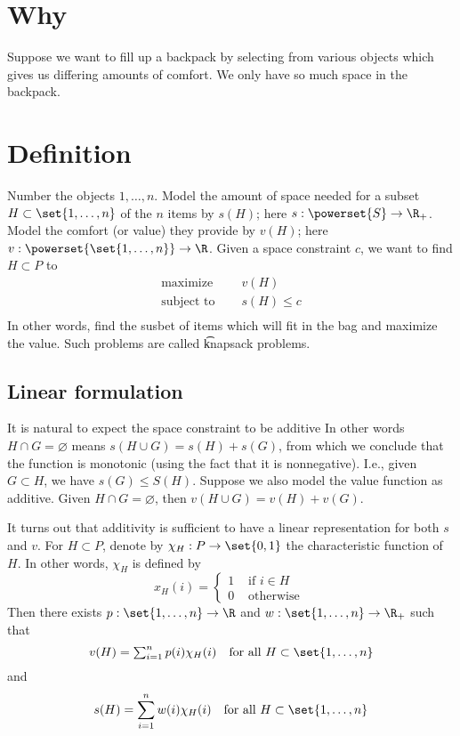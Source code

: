 
\section*{Why}

Suppose we want to fill up a backpack by selecting from various objects which gives us differing amounts of comfort.
We only have so much space in the backpack.

\section*{Definition}

Number the objects $1, \dots , n$.
Model the amount of space needed for a subset $H \subset \set{1, \dots , n}$ of the $n$ items by $s(H)$; here $s: \powerset{S} \to \R _+$.
Model the comfort (or value) they provide by $v(H)$; here $v: \powerset{\set{1,\dots , n}} \to \R $.
Given a space constraint $c$, we want to find $H \subset P$ to
\[
\begin{aligned}
\text{maximize} & \quad v(H) \\
\text{subject to } & \quad s(H) \leq c \\
\end{aligned}
\]
In other words, find the susbet of items which will fit in the bag and maximize the value.
Such problems are called \t{knapsack problems}.

\subsection*{Linear formulation}

It is natural to expect the space constraint to be additive
In other words $H \cap  G = \varnothing$ means $s(H \cup G) = s(H) + s(G)$, from which we conclude that the function is monotonic (using the fact that it is nonnegative).
I.e., given $G \subset H$, we have $s(G) \leq S(H)$.
Suppose we also model the value function as additive.
Given $H \cap  G = \varnothing$, then $v(H \cup G) = v(H) + v(G)$.

It turns out that additivity is sufficient to have a linear representation for both $s$ and $v$.
For $H \subset P$, denote by $\chi _H: P \to \set{0,1}$ the characteristic function of $H$.
In other words, $\chi _H$ is defined by
\[
x_H(i) = \begin{cases}
1 & \text{ if } i \in H \\
0 & \text{ otherwise }
\end{cases}
\]
Then there exists $p: \set{1, \dots , n} \to \R $ and $w: \set{1, \dots , n} \to \R _+$ such that
\[
\textstyle
v(H) = \sum_{i = 1}^{n} p(i) \chi _H(i) \quad \text{for all } H \subset \set{1, \dots , n}
\]
and
\[
s(H) = \sum_{i = 1}^{n} w(i) \chi _H(i) \quad \text{for all } H \subset \set{1, \dots , n}
\]


